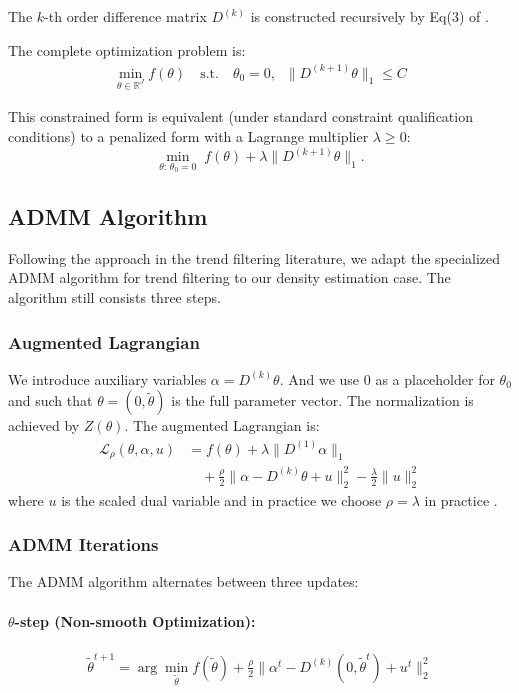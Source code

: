 The $k$-th order difference matrix $D^{(k)}$ is constructed recursively by Eq(3) of \citep{ramdas2016fast}.

The complete optimization problem is:
\begin{align} \label{eq:tf_admm_problem}
\boxed{
\min_{\theta \in \mathbb{R}^{J}} f(\theta)
\quad \text{s.t.}\quad \theta_0 = 0,\;\; \|D^{(k+1)}\theta\|_1 \leq C
}
\end{align}

This constrained form is equivalent (under standard constraint qualification conditions) to a penalized form with a Lagrange multiplier $\lambda\ge 0$:
\[
\min_{\theta:\,\theta_0=0}\; f(\theta) + \lambda \|D^{(k+1)}\theta\|_1.
\]

\subsection{ADMM Algorithm}

Following the approach in the trend filtering literature, we adapt the specialized ADMM algorithm for trend filtering to our density estimation case. The algorithm still consists three steps.

\subsubsection{Augmented Lagrangian}

We introduce auxiliary variables $\alpha = D^{(k)} \theta$. And we use $0$ as a placeholder for $\theta_0$ and such that $\theta = (0, \tilde{\theta})$ is the full parameter vector. The normalization is achieved by $Z(\theta)$. The augmented Lagrangian is:
\begin{align*}
\mathcal{L}_\rho(\theta, \alpha, u) &= f(\theta) + \lambda \|D^{(1)} \alpha\|_1 \\
&\quad + \frac{\rho}{2} \|\alpha - D^{(k)} \theta + u\|_2^2 - \frac{\lambda}{2} \|u\|_2^2
\end{align*}
where $u$ is the scaled dual variable and in practice we choose $\rho = \lambda$ in practice \citet{ramdas2016fast}.

\subsubsection{ADMM Iterations}

The ADMM algorithm alternates between three updates:

\paragraph{$\theta$-step (Non-smooth Optimization):}
\begin{align*}
\tilde{\theta}^{t+1} = \arg\min_{\tilde{\theta}} f(\tilde{\theta}) + \frac{\rho}{2} \|\alpha^t - D^{(k)} (0, \tilde{\theta}^t) + u^t\|_2^2
\end{align*}

